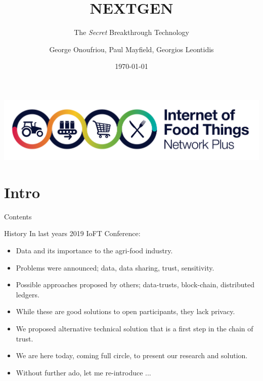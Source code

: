 \documentclass[aspectratio=169]{beamer}
\title{NEXTGEN}
\subtitle{The \textit{Secret} Breakthrough Technology}
\author{George Onoufriou, Paul Mayfield, Georgios Leontidis}
\date{\today}
\begin{document}

  \begin{frame}
    \titlepage
    \begin{center}
      \includegraphics[width=0.3\linewidth]{ioft_extract.png}
    \end{center}
  \end{frame}



  \section{Intro}

    \begin{frame}{Contents}
      \tableofcontents
    \end{frame}

    \begin{frame}{History}
      In last years 2019 IoFT Conference:
      \begin{itemize}
        \item Data and its importance to the agri-food industry.
        \item Problems were announced; data, data sharing, trust, sensitivity.
        \item Possible approaches proposed by others; data-trusts, block-chain, distributed ledgers.
        \item While these are good solutions to open participants, they lack privacy.
        \item We proposed alternative technical solution that is a first step in the chain of trust.
        \item We are here today, coming full circle, to present our research and solution.
        \item Without further ado, let me re-introduce ...
      \end{itemize}
    \end{frame}
\end{document}
